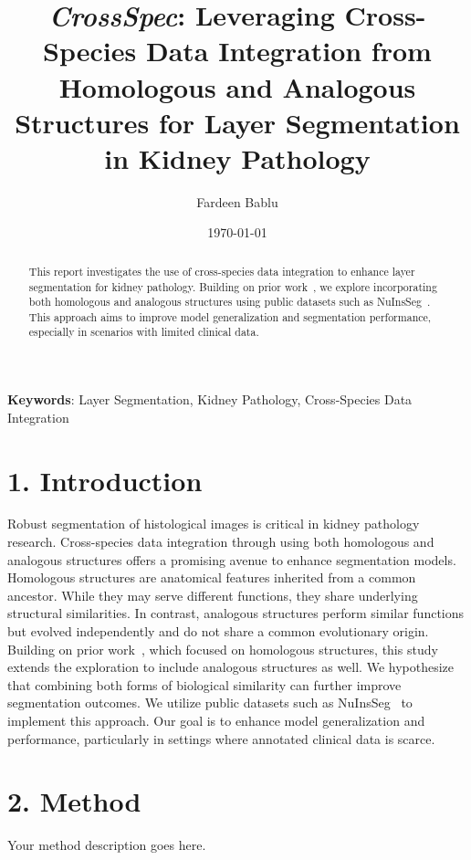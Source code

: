 \documentclass[11pt]{article}
\title{\bfseries\Large \textit{CrossSpec}: Leveraging Cross-Species Data Integration from Homologous and Analogous Structures for Layer Segmentation in Kidney Pathology}
\author[1]{Fardeen Bablu}
\affil[1]{Department of Computer Science, Vanderbilt University, Nashville, TN, USA \\ \texttt{fardeen.bablu@vanderbilt.edu}}
\date{\today}
\begin{document}
\maketitle

\begin{abstract}
\noindent
This report investigates the use of cross-species data integration to enhance layer segmentation for kidney pathology. Building on prior work~\cite{zhu2025crossspeciesdataintegrationenhanced}, we explore incorporating both homologous and analogous structures using public datasets such as NuInsSeg~\cite{Mahbod2024}. This approach aims to improve model generalization and segmentation performance, especially in scenarios with limited clinical data.
\end{abstract}

\textbf{Keywords}: Layer Segmentation, Kidney Pathology, Cross-Species Data Integration

\section*{1. Introduction}
\noindent
Robust segmentation of histological images is critical in kidney pathology research. Cross-species data integration through using both homologous and analogous structures offers a promising avenue to enhance segmentation models. Homologous structures are anatomical features inherited from a common ancestor. While they may serve different functions, they share underlying structural similarities. In contrast, analogous structures perform similar functions but evolved independently and do not share a common evolutionary origin. Building on prior work~\cite{zhu2025crossspeciesdataintegrationenhanced}, which focused on homologous structures, this study extends the exploration to include analogous structures as well. We hypothesize that combining both forms of biological similarity can further improve segmentation outcomes. We utilize public datasets such as NuInsSeg~\cite{Mahbod2024} to implement this approach. Our goal is to enhance model generalization and performance, particularly in settings where annotated clinical data is scarce.

\section*{2. Method}
\noindent
Your method description goes here.



\end{document}
